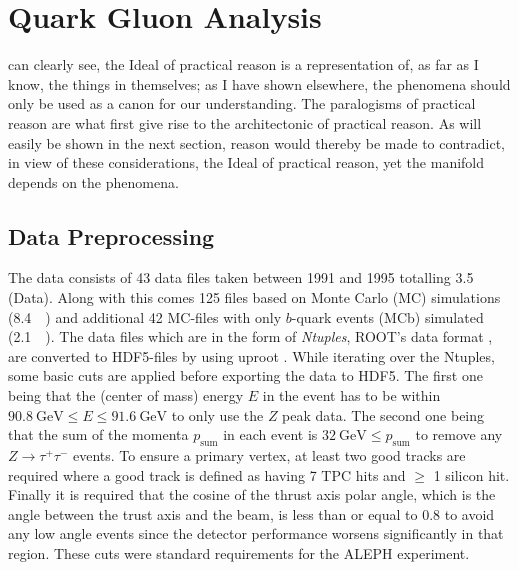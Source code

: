 
\chapter{Quark Gluon Analysis}
\label{ch:quark_gluon_analysis}

 can clearly see, the Ideal of practical reason is a representation of, as far as I know, the things in themselves; as I have shown elsewhere, the phenomena should only be used as a canon for our understanding. The paralogisms of practical reason are what first give rise to the architectonic of practical reason. As will easily be shown in the next section, reason would thereby be made to contradict, in view of these considerations, the Ideal of practical reason, yet the manifold depends on the phenomena.


\section{Data Preprocessing}
\label{sec:q:data_preprocessing}

The data consists of \num{43} data files taken between \num{1991} and \num{1995} totalling \SI{3.5}{\giga\byte} (Data). Along with this comes \num{125} files based on Monte Carlo (MC) simulations (\SI{8.4}{\giga\byte}) and additional \num{42} MC-files with only $b$-quark events (MCb) simulated (\SI{2.1}{\giga\byte}). The data files which are in the form of \emph{Ntuples}, ROOT's data format \autocite{brunROOTObjectOriented1997}, are converted to HDF5-files by using uproot \autocite{ScikithepUproot2019}. While iterating over the Ntuples, some basic cuts are applied before exporting the data to HDF5. The first one being that the (center of mass) energy $E$ in the event has to be within $\SI{90.8}{\GeV} \leq E \leq \SI{91.6}{\GeV}$ to only use the $Z$ peak data. The second one being that the sum of the momenta $p_\mathrm{sum}$ in each event is $\SI{32}{\GeV} \leq p_\mathrm{sum}$ to remove any $Z \rightarrow \tau^+ \tau^-$ events. To ensure a primary vertex, at least two good tracks are required where a good track is defined as having \num{7} TPC hits and $\geq$ 1 silicon hit. Finally it is required that the cosine of the thrust axis polar angle, which is the angle between the trust axis and the beam, is less than or equal to \num{0.8} to avoid any low angle events since the detector performance worsens significantly in that region. These cuts were standard requirements for the ALEPH experiment.

